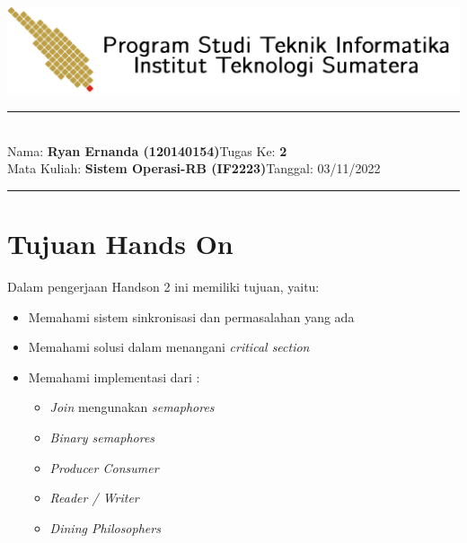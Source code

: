 \documentclass[11pt,a4paper]{article}
\newcommand{\stuid}{120140154}
\newcommand{\student}{\textbf{Ryan Ernanda (\stuid{})}}
\newcommand{\course}{\textbf{Sistem Operasi-RB (IF2223)}}
\newcommand{\assignment}{\textbf{2}} %
\begin{document}
\thispagestyle{empty}
\begin{center}
	\includegraphics[scale = 0.15]{Figure/ifitera-header.png}
	\vspace{0.1cm}
\end{center}
\noindent
{\large
\rule{17cm}{0.2cm}\\[0.3cm]
Nama: \student \hfill Tugas Ke: \assignment\\[0.1cm]
Mata Kuliah: \course \hfill Tanggal: 03/11/2022\\
\rule{17cm}{0.05cm}
\vspace{0.1cm}
}


\section{Tujuan Hands On}
Dalam pengerjaan Handson 2 ini memiliki tujuan, yaitu:
\begin{itemize}
	\item Memahami sistem sinkronisasi dan permasalahan yang ada
	\item Memahami solusi dalam menangani \textit{critical section}
	\item Memahami implementasi dari :
		\begin{itemize}
			\item \textit{Join} mengunakan \textit{semaphores}
			\item \textit{Binary semaphores}
			\item \textit{Producer Consumer}
			\item \textit{Reader / Writer}
			\item \textit{Dining Philosophers}
		\end{itemize}
\end{itemize}
\end{document}
